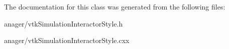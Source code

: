 The documentation for this class was generated from the following files:\begin{DoxyCompactItemize}
\item 
anager/vtkSimulationInteractorStyle.h\item 
anager/vtkSimulationInteractorStyle.cxx\end{DoxyCompactItemize}
